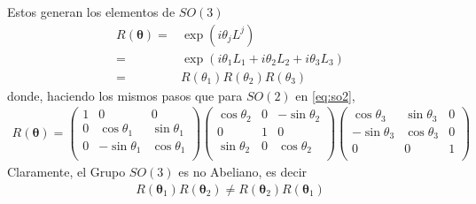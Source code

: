 Estos generan los elementos de $SO(3)$
\begin{align}
  R(\boldsymbol{\theta})=&\exp(i \theta_j L^{j})\nonumber\\
                        =&\exp(i\theta_1 L_1+i\theta_2 L_2+i\theta_3 L_3)\nonumber\\
                        =&R(\theta_1)R(\theta_2)R(\theta_3)
\end{align}
donde, haciendo los mismos pasos que para $SO(2)$ en \eqref{eq:so2},
\begin{align}
  R(\boldsymbol{\theta})=
  \begin{pmatrix}
   1 &   0        &0\\
   0 &\cos\theta_1  & \sin\theta_1\\
   0 & -\sin\theta_1& \cos\theta_1\\
  \end{pmatrix}
  \begin{pmatrix}
     \cos\theta_2 &0& -\sin\theta_2\\
     0          &1& 0          \\
    \sin\theta_2  &0&  \cos\theta_2\\
  \end{pmatrix}
  \begin{pmatrix}
     \cos\theta_3 & \sin\theta_3&0\\
     -\sin\theta_3& \cos\theta_3&0\\
      0         &     0     &1\\
  \end{pmatrix}
\end{align}
Claramente, el Grupo $SO(3)$ es no Abeliano, es decir
\begin{align*}
  R(\boldsymbol{\theta}_1)R(\boldsymbol{\theta}_2)\ne R(\boldsymbol{\theta}_2)R(\boldsymbol{\theta}_1)
\end{align*}


